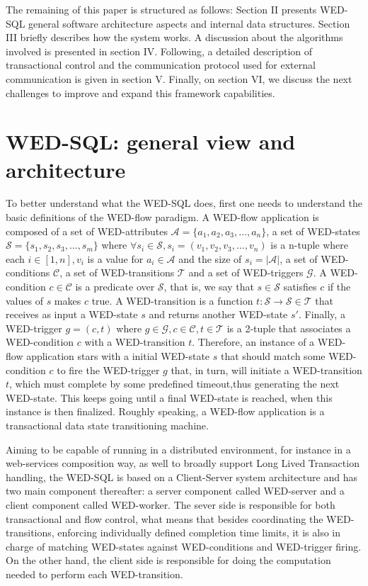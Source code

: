 \documentclass[12pt]{article}
\begin{document}
\par The remaining of this paper is structured as follows: Section II presents WED-SQL general software architecture aspects and
internal data structures. Section III briefly describes how the system works. A discussion about the algorithms involved
is presented in section IV. Following, a detailed description of transactional control and the communication protocol used
for external communication is given in section V. Finally, on section VI, we discuss the next challenges to improve and
expand this framework capabilities.  

\section{WED-SQL: general view and architecture}

To better understand what the WED-SQL does, first one needs to understand the basic definitions of the WED-flow paradigm. 
A WED-flow application is composed of a set of WED-attributes $\mathcal{A} = \{a_1,a_2,a_3,\ldots,a_n\}$, a set of WED-states
$\mathcal{S} = \{s_1,s_2,s_3,\ldots,s_m\}$ where $ \forall s_i \in \mathcal{S}, s_i = (v_1,v_2,v_3,\ldots,v_n)$
is a n-tuple where each $i\in[1,n], v_i$ is a value for $a_i \in \mathcal{A}$ and the size of $s_i = |\mathcal{A}|$, a set of
WED-conditions $\mathcal{C}$, a set of WED-transitions $\mathcal{T}$ and a set of WED-triggers $\mathcal{G}$. A WED-condition
$c \in \mathcal{C}$ is a predicate over $\mathcal{S}$, that is, we say that $s \in \mathcal{S}$ satisfies $c$ if the values
of $s$ makes $c$ true. A WED-transition is a function $t: \mathcal{S}\rightarrow\mathcal{S} \in \mathcal{T}$ that receives 
as input a WED-state $s$ and returns another WED-state $s'$. Finally, a WED-trigger $g = (c,t)$ where $g \in \mathcal{G},
c \in \mathcal{C}, t \in \mathcal{T}$ is a 2-tuple that associates a WED-condition $c$ with a WED-transition $t$. Therefore,
an instance of a WED-flow application stars with a initial WED-state $s$ that should match some WED-condition $c$ to fire
the WED-trigger $g$ that, in turn, will initiate a WED-transition $t$, which must complete by some predefined timeout,thus 
generating the next WED-state. This keeps going until a final WED-state is reached, when this instance is then finalized. 
Roughly speaking, a WED-flow application is a transactional data state transitioning machine.

\par
Aiming to be capable of running in a distributed environment, for instance in a web-services composition way, as well
to broadly support Long Lived Transaction handling, the WED-SQL is based on a Client-Server system architecture and has
two main component thereafter: a server component called WED-server and a client component called WED-worker. The
sever side is responsible for both transactional and flow control, what means that besides coordinating the WED-transitions, 
enforcing individually defined completion time limits, it is also in charge of matching WED-states against WED-conditions 
and WED-trigger firing. On the other hand, the client side is responsible for doing the computation needed to perform each
WED-transition. 
\end{document}
